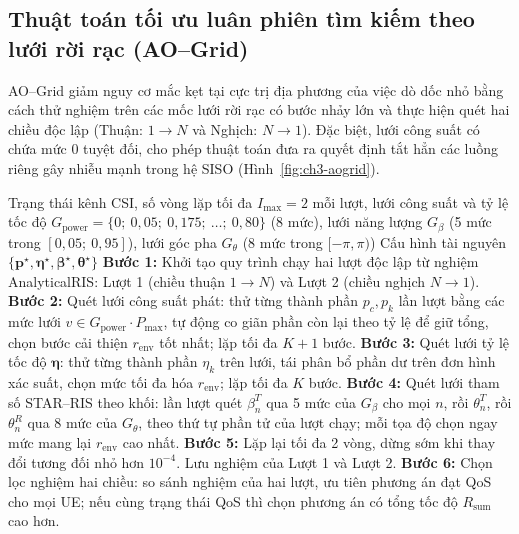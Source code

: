 

\subsection{Thuật toán tối ưu luân phiên tìm kiếm theo lưới rời rạc (AO--Grid)}
\label{ssec:ch3-ao-grid}

AO--Grid giảm nguy cơ mắc kẹt tại cực trị địa phương của việc dò dốc nhỏ bằng cách thử nghiệm trên các mốc lưới
rời rạc có bước nhảy lớn và thực hiện quét hai chiều độc lập (Thuận: $1 \to N$ và Nghịch: $N \to 1$). Đặc biệt,
lưới công suất có chứa mức $0$ tuyệt đối, cho phép thuật toán đưa ra quyết định tắt hẳn các luồng riêng gây nhiễu
mạnh trong hệ SISO (Hình~\ref{fig:ch3-aogrid}).

\begin{algorithm}[htbp]
\caption{Tối ưu luân phiên tìm kiếm theo lưới (AO--Grid)}
\label{alg:ao-grid}
\begin{algorithmic}[1]
\Require Trạng thái kênh CSI, số vòng lặp tối đa $I_{\max} = 2$ mỗi lượt, lưới công suất và tỷ lệ tốc độ
  $G_{\mathrm{power}} = \{0;\ 0,05;\ 0,175;\ \dots;\ 0,80\}$ (8 mức), lưới năng lượng $G_\beta$ (5 mức trong
  $[0,05;\ 0,95]$), lưới góc pha $G_\theta$ (8 mức trong $[-\pi, \pi)$)
\Ensure Cấu hình tài nguyên $\{\mathbf{p}^\star, \boldsymbol{\eta}^\star, \boldsymbol{\beta}^\star,
  \boldsymbol{\theta}^\star\}$
\State \textbf{Bước 1:} Khởi tạo quy trình chạy hai lượt độc lập từ nghiệm AnalyticalRIS: Lượt 1 (chiều thuận
  $1 \to N$) và Lượt 2 (chiều nghịch $N \to 1$).
\State \textbf{Bước 2:} Quét lưới công suất phát: thử từng thành phần $p_c, p_k$ lần lượt bằng các mức lưới
  $v \in G_{\mathrm{power}} \cdot P_{\max}$, tự động co giãn phần còn lại theo tỷ lệ để giữ tổng, chọn bước cải
  thiện $r_{\mathrm{env}}$ tốt nhất; lặp tối đa $K + 1$ bước.
\State \textbf{Bước 3:} Quét lưới tỷ lệ tốc độ $\boldsymbol{\eta}$: thử từng thành phần $\eta_k$ trên lưới, tái
  phân bổ phần dư trên đơn hình xác suất, chọn mức tối đa hóa $r_{\mathrm{env}}$; lặp tối đa $K$ bước.
\State \textbf{Bước 4:} Quét lưới tham số STAR--RIS theo khối: lần lượt quét $\beta^T_n$ qua 5 mức của $G_\beta$
  cho mọi $n$, rồi $\theta^T_n$, rồi $\theta^R_n$ qua 8 mức của $G_\theta$, theo thứ tự phần tử của lượt chạy;
  mỗi tọa độ chọn ngay mức mang lại $r_{\mathrm{env}}$ cao nhất.
\State \textbf{Bước 5:} Lặp lại tối đa 2 vòng, dừng sớm khi thay đổi tương đối nhỏ hơn $10^{-4}$. Lưu nghiệm của
  Lượt 1 và Lượt 2.
\State \textbf{Bước 6:} Chọn lọc nghiệm hai chiều: so sánh nghiệm của hai lượt, ưu tiên phương án đạt QoS cho mọi
  UE; nếu cùng trạng thái QoS thì chọn phương án có tổng tốc độ $R_{\mathrm{sum}}$ cao hơn.
\end{algorithmic}
\end{algorithm}

